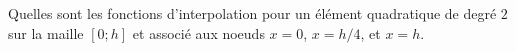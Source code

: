 \bexo

Quelles sont les fonctions d'interpolation pour un élément quadratique de degré $2$ sur la maille  $[0;h]$ et associé aux noeuds $x=0$, $x=h/4$, et $x=h$.

\eexo

\solution{

}